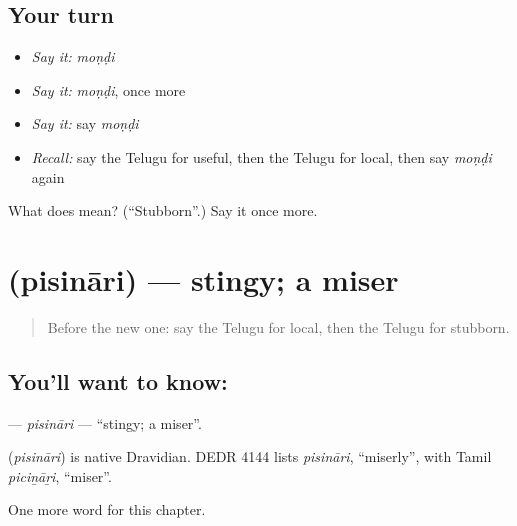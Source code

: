 \subsection*{Your turn}
\begin{itemize}
\raggedright
  \item \emph{Say it:} \emph{moṇḍi}
  \item \emph{Say it:} \emph{moṇḍi}, once more
  \item \emph{Say it:} say \emph{moṇḍi}
  \item \emph{Recall:} say the Telugu for useful, then the Telugu for local, then say \emph{moṇḍi} again
\end{itemize}

\begin{tcolorbox}[breakable,colback=teal!4,colframe=teal!35!black,title={Before you move on}]
What does  mean? (\textquotedblleft{}Stubborn\textquotedblright{}.) Say it once more.
\end{tcolorbox}
\section[\texorpdfstring{\te{పిసినారి} (pisināri)}{పిసినారి (pisināri)}]{ (pisināri) — stingy; a miser}

\label{lesson:TE-C297-pisinari}



\begin{quote}
Before the new one: say the Telugu for local, then the Telugu for stubborn.
\end{quote}

\subsection*{You'll want to know: }
\textbf{} — \emph{pisināri} — \textquotedblleft{}stingy; a miser\textquotedblright{}.

\begin{cousinweb}
\textbf{} (\emph{pisināri}) is native Dravidian. DEDR 4144 lists \emph{pisināri}, \textquotedblleft{}miserly\textquotedblright{}, with Tamil \emph{piciṉāṟi}, \textquotedblleft{}miser\textquotedblright{}.
\end{cousinweb}

\begin{grammarlens}[title={What you've built}]
One more word for this chapter.
\end{grammarlens}

